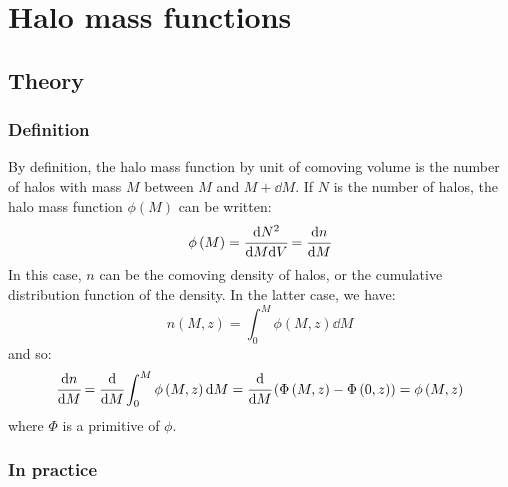 \chapter{Halo mass functions}
\minitoc%

\section{Theory}

\subsection{Definition}

By definition, the halo mass function by unit of comoving volume is the
number of halos with mass $M$ between $M$ and $M+\dd{M}$. If $N$ is
the number of halos, the halo mass function $\phi\left(M\right)$ can be
written:
%
\begin{equation}
    \phi\left(M\right)=\cfrac{{\rm{d}} N^2}{{\rm{d}} M{\rm{d}} V}=\cfrac{{\rm{d}} n}{{\rm{d}} M}
\end{equation}
%
In this case, $n$ can be the comoving density of halos, or the cumulative
distribution function of the density. In the latter case, we have:
%
\begin{equation}
    n\left(M,z\right)=\int_0^M\phi\left(M,z\right)\dd M
\end{equation}
%
and so:
%
\begin{equation}
    \cfrac{{\rm{d}} n}{{\rm{d}} M}=\cfrac{{\rm{d}}}{{\rm{d}} M}\int_0^M\phi\left(M,z\right){\rm{d}} M=
    \cfrac{{\rm{d}}}{{\rm{d}} M}\left(\Phi\left(M,z\right)-\Phi\left(0,z\right)\right)=
    \phi\left(M,z\right)
\end{equation}
%
where $\Phi$ is a primitive of $\phi$.

\subsection{In practice}

